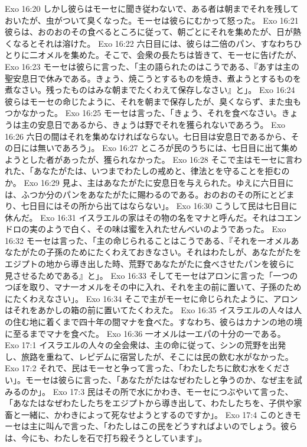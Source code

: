 Exo 16:20  しかし彼らはモーセに聞き従わないで、ある者は朝までそれを残しておいたが、虫がついて臭くなった。モーセは彼らにむかって怒った。
Exo 16:21  彼らは、おのおのその食べるところに従って、朝ごとにそれを集めたが、日が熱くなるとそれは溶けた。
Exo 16:22  六日目には、彼らは二倍のパン、すなわちひとりに二オメルを集めた。そこで、会衆の長たちは皆きて、モーセに告げたが、
Exo 16:23  モーセは彼らに言った、「主の語られたのはこうである、『あすは主の聖安息日で休みである。きょう、焼こうとするものを焼き、煮ようとするものを煮なさい。残ったものはみな朝までたくわえて保存しなさい』と」。
Exo 16:24  彼らはモーセの命じたように、それを朝まで保存したが、臭くならず、また虫もつかなかった。
Exo 16:25  モーセは言った、「きょう、それを食べなさい。きょうは主の安息日であるから、きょうは野でそれを獲られないであろう。
Exo 16:26  六日の間はそれを集めなければならない。七日目は安息日であるから、その日には無いであろう」。
Exo 16:27  ところが民のうちには、七日目に出て集めようとした者があったが、獲られなかった。
Exo 16:28  そこで主はモーセに言われた、「あなたがたは、いつまでわたしの戒めと、律法とを守ることを拒むのか。
Exo 16:29  見よ、主はあなたがたに安息日を与えられた。ゆえに六日目には、ふつか分のパンをあなたがたに賜わるのである。おのおのその所にとどまり、七日目にはその所から出てはならない」。
Exo 16:30  こうして民は七日目に休んだ。
Exo 16:31  イスラエルの家はその物の名をマナと呼んだ。それはコエンドロの実のようで白く、その味は蜜を入れたせんべいのようであった。
Exo 16:32  モーセは言った、「主の命じられることはこうである、『それを一オメルあなたがたの子孫のためにたくわえておきなさい。それはわたしが、あなたがたをエジプトの地から導き出した時、荒野であなたがたに食べさせたパンを彼らに見させるためである』と」。
Exo 16:33  そしてモーセはアロンに言った「一つのつぼを取り、マナ一オメルをその中に入れ、それを主の前に置いて、子孫のためにたくわえなさい」。
Exo 16:34  そこで主がモーセに命じられたように、アロンはそれをあかしの箱の前に置いてたくわえた。
Exo 16:35  イスラエルの人々は人の住む地に着くまで四十年の間マナを食べた。すなわち、彼らはカナンの地の境に至るまでマナを食べた。
Exo 16:36  一オメルは一エパの十分の一である。
Exo 17:1  イスラエルの人々の全会衆は、主の命に従って、シンの荒野を出発し、旅路を重ねて、レピデムに宿営したが、そこには民の飲む水がなかった。
Exo 17:2  それで、民はモーセと争って言った、「わたしたちに飲む水をください」。モーセは彼らに言った、「あなたがたはなぜわたしと争うのか、なぜ主を試みるのか」。
Exo 17:3  民はその所で水にかわき、モーセにつぶやいて言った、「あなたはなぜわたしたちをエジプトから導き出して、わたしたちを、子供や家畜と一緒に、かわきによって死なせようとするのですか」。
Exo 17:4  このときモーセは主に叫んで言った、「わたしはこの民をどうすればよいのでしょう。彼らは、今にも、わたしを石で打ち殺そうとしています」。
